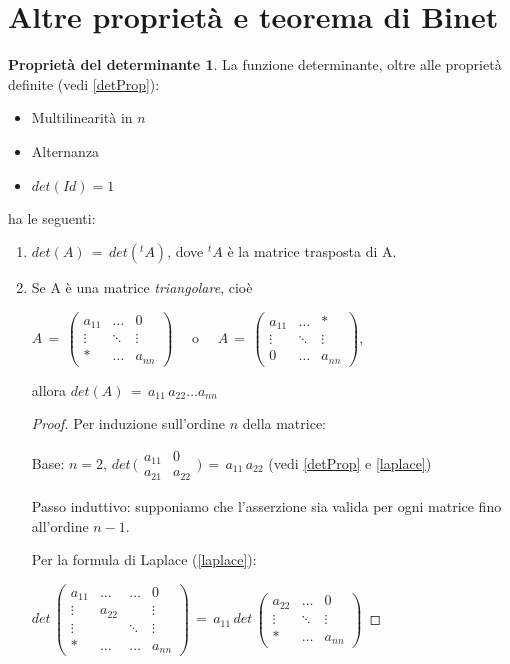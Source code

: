 \documentclass[a4paper]{report}
\theoremstyle{remark}
\theoremstyle{definition}
\newtheorem{detProp}{Proprietà del determinante}
\begin{document}
\section{Altre proprietà e teorema di Binet}
\begin{detProp}
	La funzione determinante, oltre alle proprietà definite (vedi \ref{detProp}):
	\begin{itemize}
		\item Multilinearità in $n$
		\item Alternanza
		\item $det(Id)=1$
	\end{itemize}
	ha le seguenti:
	\begin{enumerate}
		\item $det(A)\,=\,det(^{t}A)$, dove $^{t}A$ è la matrice trasposta di A.
		\item Se A è una matrice {\itshape triangolare}, cioè
	
			$A\,=\,
			\begin{pmatrix}
				a_{11} & \dots & 0\\
				\vdots & \ddots & \vdots\\
				* & \dots & a_{nn}
			\end{pmatrix}\quad$
			o
			$\quad A\,=\,
			\begin{pmatrix}
			a_{11} & \dots & *\\
			\vdots & \ddots & \vdots\\
			0 & \dots & a_{nn}
			\end{pmatrix}$,
			
			allora $det(A)\,=\,a_{11}\,a_{22}\dots a_{nn}$
			\begin{proof}
				Per induzione sull'ordine $n$ della matrice:
				
				Base: $n=2$, $det\,\bigr(
				\begin{smallmatrix}
				a_{11} & 0\\
				a_{21} & a_{22}
				\end{smallmatrix}
				\bigl)\,=\,a_{11}\,a_{22}$ (vedi \ref{detProp} e \ref{laplace})
				
				Passo induttivo: supponiamo che l'asserzione sia valida per ogni matrice fino all'ordine $n-1$.
				
				Per la formula di Laplace (\ref{laplace}):
				
				$det\,
				\begin{pmatrix}
				a_{11} & \dots & \dots & 0\\
				\vdots & a_{22} & & \vdots\\
				\vdots & & \ddots & \vdots\\
				* & \dots & \dots & a_{nn}
				\end{pmatrix}
				\,=\,a_{11}\,det\,
				\begin{pmatrix}
				a_{22} & \dots & 0\\
				\vdots & \ddots & \vdots\\
				* & \dots & a_{nn}
				\end{pmatrix}$
				

\end{proof}
\end{enumerate}
\end{detProp}
\end{document}

